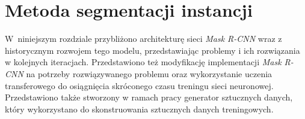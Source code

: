 \chapter{Metoda segmentacji instancji}
W~niniejszym rozdziale przybliżono architekturę sieci \textit{Mask R-CNN} wraz z historycznym rozwojem tego modelu, przedstawiając problemy i ich rozwiązania w kolejnych iteracjach. Przedstawiono też modyfikację implementacji \textit{Mask R-CNN} na potrzeby rozwiązywanego problemu oraz wykorzystanie uczenia transferowego do osiągnięcia skróconego czasu treningu sieci neuronowej.
Przedstawiono także stworzony w ramach pracy generator sztucznych danych, który wykorzystano do skonstruowania sztucznych danych treningowych.
